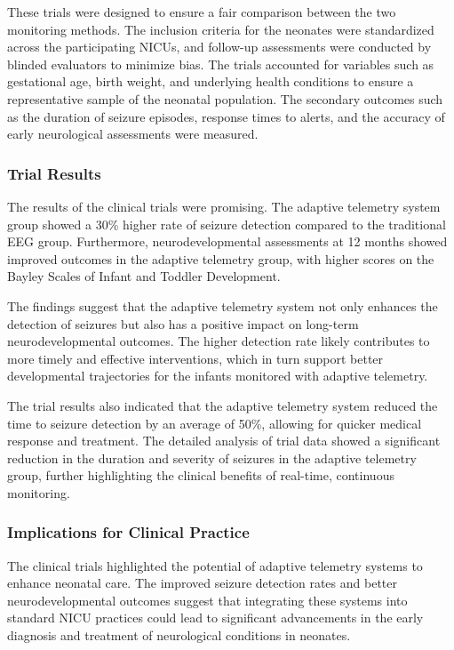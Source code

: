 \documentclass[12pt,journal,compsoc]{IEEEtran}
\begin{document}
These trials were designed to ensure a fair comparison between the two monitoring methods. The inclusion criteria for the neonates were standardized across the participating NICUs, and follow-up assessments were conducted by blinded evaluators to minimize bias. The trials accounted for variables such as gestational age, birth weight, and underlying health conditions to ensure a representative sample of the neonatal population. The secondary outcomes such as the duration of seizure episodes, response times to alerts, and the accuracy of early neurological assessments were measured.  

\subsubsection{Trial Results}

The results of the clinical trials were promising. The adaptive telemetry system group showed a 30\% higher rate of seizure detection compared to the traditional EEG group. Furthermore, neurodevelopmental assessments at 12 months showed improved outcomes in the adaptive telemetry group, with higher scores on the Bayley Scales of Infant and Toddler Development.

The findings suggest that the adaptive telemetry system not only enhances the detection of seizures but also has a positive impact on long-term neurodevelopmental outcomes. The higher detection rate likely contributes to more timely and effective interventions, which in turn support better developmental trajectories for the infants monitored with adaptive telemetry.

The trial results also indicated that the adaptive telemetry system reduced the time to seizure detection by an average of 50\%, allowing for quicker medical response and treatment. The detailed analysis of trial data showed a significant reduction in the duration and severity of seizures in the adaptive telemetry group, further highlighting the clinical benefits of real-time, continuous monitoring.

\subsubsection{Implications for Clinical Practice}

The clinical trials highlighted the potential of adaptive telemetry systems to enhance neonatal care. The improved seizure detection rates and better neurodevelopmental outcomes suggest that integrating these systems into standard NICU practices could lead to significant advancements in the early diagnosis and treatment of neurological conditions in neonates.
\end{document}
